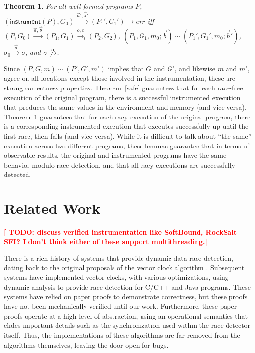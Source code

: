 \documentclass[preprint, 10pt]{sigplanconf}
\newcommand{\TODO}[1]{\textbf{\textcolor{red}{[ TODO: #1]}}}
\newcommand{\instrp}[1]{\ensuremath{\mathsf{instrument}(#1)}}
\newtheorem{theorem}{Theorem}
\begin{document}
\begin{theorem}\label{race}For all well-formed programs $P$, $(\instrp{P}, G_0) \xrightarrow{\vec{a}', \vec{b}'} (P_1', G_1') \rightarrow \mathit{err}$ iff $(P, G_0) \xrightarrow{\vec{a}, \vec{b}} (P_1, G_1) \xrightarrow{o, c}_t (P_2, G_2)$, $(P_1, G_1, m_0; \vec{b}) \sim (P_1', G_1', m_0; \vec{b}')$, $\sigma_0 \xrightarrow{\vec{a}} \sigma$, and $\sigma \not\xrightarrow{o}$.\end{theorem}
Since $(P, G, m) \sim (P', G', m')$ implies that $G$ and $G'$, and likewise $m$ and $m'$, agree on all locations except those involved in the instrumentation, these are strong correctness properties. Theorem~\ref{safe} guarantees that for each race-free execution of the original program, there is a successful instrumented execution that produces the same values in the environment and memory (and vice versa). Theorem~\ref{race} guarantees that for each racy execution of the original program, there is a corresponding instrumented execution that executes successfully up until the first race, then fails (and vice versa). While it is difficult to talk about ``the same'' execution across two different programs, these lemmas guarantee that in terms of observable results, the original and instrumented programs have the same behavior modulo race detection, and that all racy executions are successfully detected.

\section{Related Work}
\label{related}

\TODO{discuss verified instrumentation like SoftBound, RockSalt SFI? I don't think either of these support multithreading.}

There is a rich history of systems that provide dynamic data race detection, dating back to the original proposals of the vector clock algorithm \cite{friedmann,mattern,lamportvc}. Subsequent systems have implemented vector clocks, with various optimizations, using dynamic analysis to provide race detection for C/C++ \cite{pozniansky_efficient_2003,serebryany_threadsanitizer:_2009} and Java \cite{christiaens_trade:_2001,elmas_goldilocks:_2007,flanagan_fasttrack:_2009,flanagan_fasttrack:_2010,slimstate} programs. These systems have relied on paper proofs to demonstrate correctness, but these proofs have not been mechanically verified until our work. Furthermore, these paper proofs operate at a high level of abstraction, using an operational semantics that elides important details such as the synchronization used within the race detector itself. Thus, the implementations of these algorithms are far removed from the algorithms themselves, leaving the door open for bugs.
\end{document}
